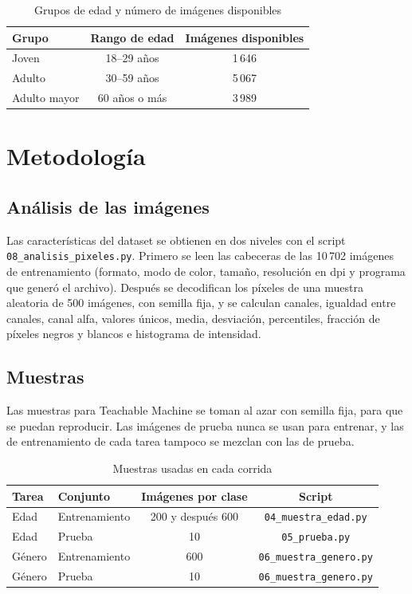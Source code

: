 \documentclass[a4paper,11pt]{article}
\begin{document}
  \begin{table}[H]
    \centering
    \caption{Grupos de edad y número de imágenes disponibles}
    \label{tab:grupos}
    \begin{tabular}{lcc}
      \toprule
      Grupo & Rango de edad & Imágenes disponibles \\
      \midrule
      Joven & 18--29 años & 1\,646 \\
      Adulto & 30--59 años & 5\,067 \\
      Adulto mayor & 60 años o más & 3\,989 \\
      \bottomrule
    \end{tabular}
  \end{table}

  \section{Metodología}
  \subsection{Análisis de las imágenes}
  Las características del dataset se obtienen en dos niveles con el script
  \texttt{08\_analisis\_pixeles.py}. Primero se leen las cabeceras de las 10\,702
  imágenes de entrenamiento (formato, modo de color, tamaño, resolución en dpi y
  programa que generó el archivo). Después se decodifican los píxeles de una
  muestra aleatoria de 500 imágenes, con semilla fija, y se calculan canales,
  igualdad entre canales, canal alfa, valores únicos, media, desviación,
  percentiles, fracción de píxeles negros y blancos e histograma de intensidad.

  \subsection{Muestras}
  Las muestras para Teachable Machine se toman al azar con semilla fija, para que
  se puedan reproducir. Las imágenes de prueba nunca se usan para entrenar, y
  las de entrenamiento de cada tarea tampoco se mezclan con las de prueba.

  \begin{table}[H]
    \centering
    \caption{Muestras usadas en cada corrida}
    \label{tab:muestras}
    \begin{tabular}{llcc}
      \toprule
      Tarea & Conjunto & Imágenes por clase & Script \\
      \midrule
      Edad & Entrenamiento & 200 y después 600 & \texttt{04\_muestra\_edad.py} \\
      Edad & Prueba & 10 & \texttt{05\_prueba.py} \\
      Género & Entrenamiento & 600 & \texttt{06\_muestra\_genero.py} \\
      Género & Prueba & 10 & \texttt{06\_muestra\_genero.py} \\
      \bottomrule
    \end{tabular}
  \end{table}
\end{document}
